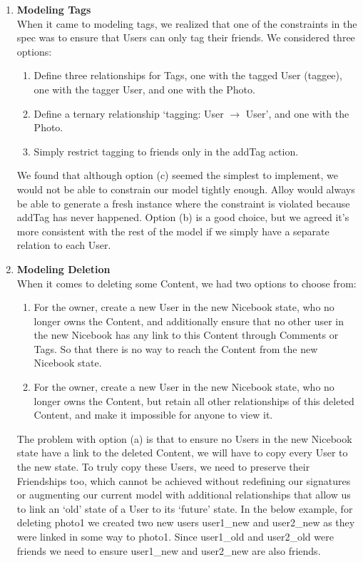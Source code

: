 \documentclass[titlepage]{article}
\begin{document}
\begin{enumerate}
	\item \textbf{Modeling Tags}\\
	      When it came to modeling tags, we realized that one of the constraints in the spec was to ensure that Users can only tag their friends. We considered three options:
	      \begin{enumerate}
		      \item Define three relationships for Tags, one with the tagged User (taggee), one with the tagger User, and one with the Photo.
		      \item Define a ternary relationship ‘tagging: User $\rightarrow$ User’, and one with the Photo.
		      \item Simply restrict tagging to friends only in the addTag action.
	      \end{enumerate}
	      We found that although option (c) seemed the simplest to implement, we would not be able to constrain our model tightly enough. Alloy would always be able to generate a fresh instance where the constraint is violated because addTag has never happened. Option (b) is a good choice, but we agreed it’s more consistent with the rest of the model if we simply have a separate relation to each User.
	\item \textbf{Modeling Deletion}\\
	      When it comes to deleting some Content, we had two options to choose from:
	      \begin{enumerate}
		      \item For the owner, create a new User in the new Nicebook state, who no longer owns the Content, and additionally ensure that no other user in the new Nicebook has any link to this Content through Comments or Tags. So that there is no way to reach the Content from the new Nicebook state.
		      \item For the owner, create a new User in the new Nicebook state, who no longer owns the Content, but retain all other relationships of this deleted Content, and make it impossible for anyone to view it.
	      \end{enumerate}
	      The problem with option (a) is that to ensure no Users in the new Nicebook state have a link to the deleted Content, we will have to copy every User to the new state. To truly copy these Users, we need to preserve their Friendships too, which cannot be achieved without redefining our signatures or augmenting our current model with additional relationships that allow us to link an ‘old’ state of a User to its ‘future’ state. In the below example, for deleting photo1 we created two new users user1\_new and user2\_new as they were linked in some way to photo1. Since user1\_old and user2\_old were friends we need to ensure user1\_new and user2\_new are also friends.


\end{enumerate}
\end{document}

